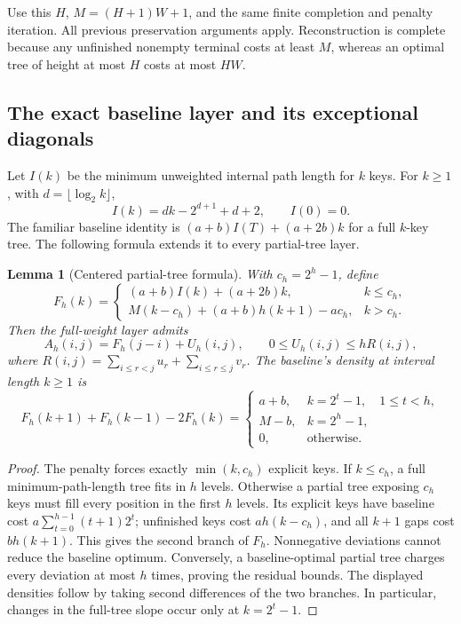 \documentclass[11pt]{article}
\newtheorem{lemma}[theorem]{Lemma}
\begin{document}
Use this $H$, $M=(H+1)W+1$, and the same finite completion and penalty
iteration. All previous preservation arguments apply. Reconstruction is
complete because any unfinished nonempty terminal costs at least $M$,
whereas an optimal tree of height at most $H$ costs at most $HW$.

\subsection{The exact baseline layer and its exceptional diagonals}\label{sec:baseline-layer}
Let $I(k)$ be the minimum unweighted internal path length for $k$ keys.
For $k\ge1$, with $d=\lfloor\log_2 k\rfloor$,
\[
 I(k)=dk-2^{d+1}+d+2,\qquad I(0)=0.
\]
The familiar baseline identity is
$(a+b)I(T)+(a+2b)k$ for a full $k$-key tree. The following formula extends it to every partial-tree layer.

\begin{lemma}[Centered partial-tree formula]\label{lem:centered-layer}
With $c_h=2^h-1$, define
\[
 F_h(k)=
 \begin{cases}
 (a+b)I(k)+(a+2b)k,&k\le c_h,\\
 M(k-c_h)+(a+b)h(k+1)-ac_h,&k>c_h.
 \end{cases}
\]
Then the full-weight layer admits
\[
 A_h(i,j)=F_h(j-i)+U_h(i,j),\qquad
 0\le U_h(i,j)\le hR(i,j),
\]
where $R(i,j)=\sum_{i\le r<j}u_r+\sum_{i\le r\le j}v_r$.
The baseline's density at interval length $k\ge1$ is
\[
 F_h(k+1)+F_h(k-1)-2F_h(k)=
 \begin{cases}
 a+b,&k=2^t-1,\quad 1\le t<h,\\
 M-b,&k=2^h-1,\\
 0,&\text{otherwise}.
 \end{cases}
\]
\end{lemma}
\begin{proof}
The penalty forces exactly $\min(k,c_h)$ explicit keys. If $k\le c_h$,
a full minimum-path-length tree fits in $h$ levels. Otherwise a partial
tree exposing $c_h$ keys must fill every position in the first $h$ levels.
Its explicit keys have baseline cost
$a\sum_{t=0}^{h-1}(t+1)2^t$; unfinished keys cost $ah(k-c_h)$, and all
$k+1$ gaps cost $bh(k+1)$. This gives the second branch of $F_h$.
Nonnegative deviations cannot reduce the baseline optimum. Conversely,
a baseline-optimal partial tree charges every deviation at most $h$ times,
proving the residual bounds. The displayed densities follow by taking
second differences of the two branches. In particular, changes in the
full-tree slope occur only at $k=2^t-1$.
\end{proof}
\end{document}
